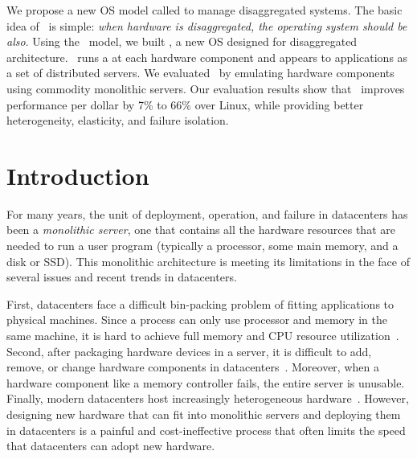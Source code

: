 \documentclass[10pt,times,twocolumn]{z2-article}
\begin{document}
We propose a new OS model called {\em \splitkernel} to manage disaggregated systems.
The basic idea of \splitkernel\ is simple: 
\textit{when hardware is disaggregated, the operating system should be also}.  
Using the \splitkernel\ model, we built \lego, 
a new OS designed for disaggregated architecture. 
\lego\ runs a {\em \microos} at each hardware component
and appears to applications as a set of distributed servers.
We evaluated \lego\ by emulating hardware components using commodity monolithic servers.
Our evaluation results show that \lego\ improves performance per dollar by 7\% to 66\% over Linux,
while providing better heterogeneity, elasticity, and failure isolation.
\fi


\section{Introduction}
\label{sec:introduction}

For many years, the unit of deployment, operation, and failure in datacenters has been a {\em monolithic server},
one that contains all the hardware resources 
that are needed to run a user program
(typically a processor, some main memory, and a disk or SSD).
This monolithic architecture is meeting its limitations in the face of 
several issues and recent trends in datacenters.

First, datacenters face a difficult bin-packing problem of fitting applications to physical machines.
Since a process can only use processor and memory in the same machine, 
it is hard to achieve full memory and CPU resource utilization~\cite{Barroso-COMPUTER,Quasar-ASPLOS,PowerNap}.
Second, after packaging hardware devices in a server, it is difficult to add, remove, or change 
hardware components in datacenters~\cite{FB-Wedge100}. 
Moreover, when a hardware component like a memory controller fails, the entire server is unusable.
Finally, modern datacenters host increasingly heterogeneous hardware~\cite{sigarch-dc,Putnam14-FPGA,TPU,DPU}.
However, designing new hardware that can fit into monolithic servers and deploying them in datacenters
is a painful and cost-ineffective process 
that often limits the speed that datacenters can adopt new hardware.
\end{document}
